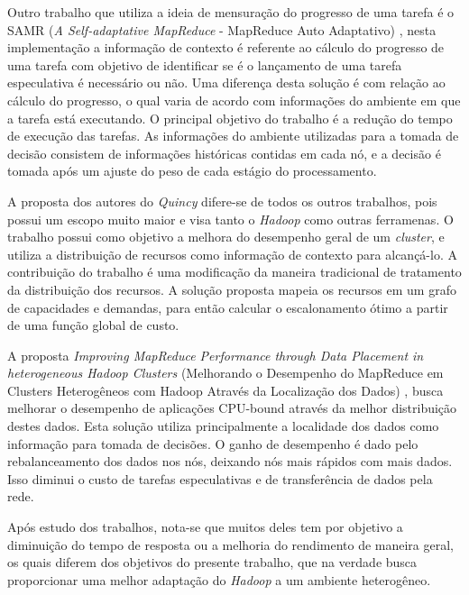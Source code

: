 Outro trabalho que utiliza a ideia de mensuração do progresso de uma tarefa é o SAMR (\textit{A Self-adaptative MapReduce} - MapReduce Auto Adaptativo) \cite{SAMR}, nesta implementação a informação de contexto é referente ao cálculo do progresso de uma tarefa com objetivo de identificar se é o lançamento de uma tarefa especulativa é necessário ou não. Uma diferença desta solução é com relação ao cálculo do progresso, o qual varia de acordo com informações do ambiente em que a tarefa está executando. O principal objetivo do trabalho é a redução do tempo de execução das tarefas. As informações do ambiente utilizadas para a tomada de decisão consistem de informações históricas contidas em cada nó, e a decisão é tomada após um ajuste do peso de cada estágio do processamento.


A proposta dos autores do \textit{Quincy} \cite{Quincy} difere-se de todos os outros trabalhos, pois possui um escopo muito maior e visa tanto o \textit{Hadoop} como outras ferramenas. O trabalho possui como objetivo a melhora do desempenho geral de um \textit{cluster}, e utiliza a distribuição de recursos como informação de contexto para alcançá-lo. A contribuição do trabalho é uma modificação da maneira tradicional de tratamento da distribuição dos recursos. A solução proposta mapeia os recursos em um grafo de capacidades e demandas, para então calcular o escalonamento ótimo a partir de uma função global de custo.

A proposta \textit{Improving MapReduce Performance through Data Placement in heterogeneous Hadoop Clusters} (Melhorando o Desempenho do MapReduce em Clusters Heterogêneos com Hadoop Através da Localização dos Dados) \cite{IMRPDPHHC}, busca melhorar o desempenho de aplicações CPU-bound através da melhor distribuição destes dados. Esta solução utiliza principalmente a localidade dos dados como informação para tomada de decisões. O ganho de desempenho é dado pelo rebalanceamento dos dados nos nós, deixando nós mais rápidos com mais dados. Isso diminui o custo de tarefas especulativas e de transferência de dados pela rede.


Após estudo dos trabalhos, nota-se que muitos deles tem por objetivo a diminuição do tempo de resposta ou a melhoria do rendimento de maneira geral, os quais diferem dos objetivos do presente trabalho, que na verdade busca proporcionar uma melhor adaptação do \emph{Hadoop} a um ambiente heterogêneo. 

